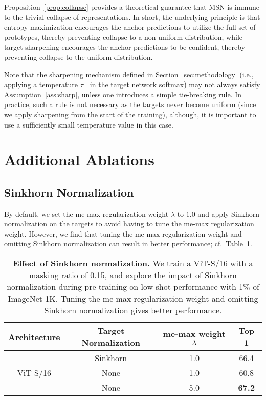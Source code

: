 \documentclass{article}
\begin{document}
Proposition~\ref{prop:collapse} provides a theoretical guarantee that MSN is immune to the trivial collapse of representations.
In short, the underlying principle is that entropy maximization encourages the anchor predictions to utilize the full set of prototypes, thereby preventing collapse to a non-uniform distribution, while target sharpening encourages the anchor predictions to be confident, thereby preventing collapse to the uniform distribution.

Note that the sharpening mechanism defined in Section~\ref{sec:methodology} (i.e., applying a temperature $\tau^+$ in the target network softmax) may not always satisfy Assumption~\ref{ass:sharp}, unless one introduces a simple tie-breaking rule.
In practice, such a rule is not necessary as the targets never become uniform (since we apply sharpening from the start of the training), although, it is important to use a sufficiently small temperature value in this case.

\section{Additional Ablations}
\label{apndx:additional_ablations}

\subsection{Sinkhorn Normalization}
By default, we set the {\sc me-max} regularization weight $\lambda$ to $1.0$ and apply Sinkhorn normalization on the targets to avoid having to tune the {\sc me-max} regularization weight.
However, we find that tuning the {\sc me-max} regularization weight and omitting Sinkhorn normalization can result in better performance; cf.~Table~\ref{tb:sinkhorn}.
\begin{table}[h]
    \centering
    \caption{{\bf Effect of Sinkhorn normalization.} We train a ViT-S/16 with a masking ratio of 0.15, and explore the impact of Sinkhorn normalization during pre-training on low-shot performance with 1\% of ImageNet-1K. Tuning the {\sc me-max} regularization weight and omitting Sinkhorn normalization gives better performance.}
    \label{tb:sinkhorn}
    \begin{tabular}{c c c | c}
        \bf Architecture & \bf Target Normalization & \bf{\sc me-max} weight $\lambda$ & \bf Top 1 \\\toprule
        \multirow{3}{*}{ViT-S/16} & Sinkhorn & 1.0 & 66.4 \\
        & None & 1.0 & 60.8 \\
        & None & 5.0 & \bf\cellcolor{fbApp} 67.2 \\
        \bottomrule
    \end{tabular}
\end{table}
\end{document}
